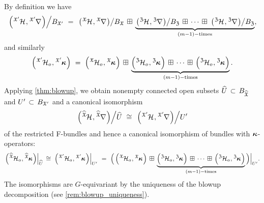 \documentclass[twoside,leqno]{article}
\numberwithin{equation}{section}
\theoremstyle{plain}
\theoremstyle{definition}
\begin{document}
By definition we have 
\begin{equation} \label{eq:FbundleX'split}
\left.\left(\tensor[^{\fX'}]{\cH}{},\tensor[^{\fX'}]{\nabla}{}\right)\right/\! B_{\fX'} \ = \ 
\left.\left(\tensor[^{\fX}]{\cH}{},\tensor[^{\fX}]{\nabla}{}\right)\right/\!  B_{\fX} \, \boxplus \, \underbrace{\left.\left(\tensor[^{\fZ}]{\cH}{},\tensor[^{\fZ}]{\nabla}{}\right)\right/\!B_{\fZ} \, \boxplus \, \cdots \, \boxplus \, \left.\left(\tensor[^{\fZ}]{\cH}{},\tensor[^{\fZ}]{\nabla}{}\right)\right/\!B_{\fZ}}_{(m-1)-\text{times}},
\end{equation}
and similarly
\begin{equation} \label{eq:kappaX'split}
\left(\tensor[^{\fX'}]{{\cH_{o}}}{},\tensor[^{\fX'}]{\bkappa}{}\right)  \ = \ 
\left(\tensor[^{\fX}]{{\cH_{o}}}{},\tensor[^{\fX}]{\bkappa}{}\right) \, \boxplus \, \underbrace{\left(\tensor[^{\fZ}]{{\cH_{o}}}{},\tensor[^{\fZ}]{\bkappa}{}\right) \, \boxplus \, \cdots \, \boxplus \, \left(\tensor[^{\fZ}]{{\cH_{o}}}{},\tensor[^{\fZ}]{\bkappa}{}\right)}_{(m-1)-\text{times}}.
\end{equation}
Applying \cref{thm:blowup}, we obtain nonempty connected open subsets   $\widehat{U} \, \subset \, B_{\widehat{\mathfrak X}}$ and 
$U'\, \subset \, B_{\mathfrak X'}$  and a canonical isomorphism 
\begin{equation} \label{eq:canblowiso}
\left.\left(\tensor[^{\widehat{\fX}}]{\cH}{},\tensor[^{\widehat{\fX}}]{\nabla}{}\right)\right/\!\widehat{U} \ \cong \ 
\left.\left(\tensor[^{\fX'}]{\cH}{},\tensor[^{\fX'}]{\nabla}{}\right)\right/\!U'
\end{equation}
of the restricted F-bundles and hence a canonical isomorphism of bundles with $\boldsymbol{\kappa}$-operators:
\begin{equation} \label{eq:kappablowup}
\left.\left(\tensor[^{\widehat{\fX}}]{{\cH_{o}}}{},\tensor[^{\widehat{\fX}}]{\bkappa}{}\right)\right|_{\widehat{U}} \, \cong \, \left.\left(\tensor[^{\fX'}]{{\cH_{o}}}{},\tensor[^{\fX'}]{\bkappa}{}\right)\right|_{U'}  \ = \ 
\Big(\left(\tensor[^{\fX}]{{\cH_{o}}}{},\tensor[^{\fX}]{\bkappa}{}\right) \, \boxplus \, \underbrace{\left(\tensor[^{\fZ}]{{\cH_{o}}}{},\tensor[^{\fZ}]{\bkappa}{}\right) \, \boxplus \, \cdots \, \boxplus \, \left(\tensor[^{\fZ}]{{\cH_{o}}}{},\tensor[^{\fZ}]{\bkappa}{}\right)}_{(m-1)-\text{times}}\Big)\Big|_{U'}.
\end{equation}
The isomorphisms are $G$-equivariant by the uniqueness of the blowup decomposition (see \cref{rem:blowup_uniqueness}).

\smallskip
\end{document}
